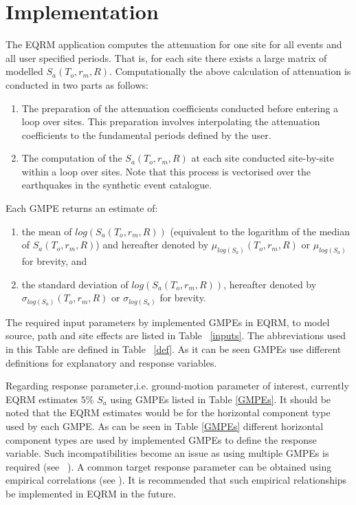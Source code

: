 \section{Implementation}\label{sec:implementation} The EQRM
application computes the attenuation for one site for all events and
all user specified periods. That is, for each site there exists a
large matrix of modelled $S_a(T_o,r_m,R)$. Computationally the above
calculation of attenuation is conducted in two parts as follows:
\begin{enumerate}
\item The preparation of the attenuation coefficients
conducted before entering a loop over sites. This preparation
involves interpolating the attenuation coefficients to the
fundamental periods defined by the user. \item The computation of
the $S_a(T_o,r_m,R)$ at each site conducted site-by-site within a
loop over sites. Note that this process is vectorised over the
earthquakes in the synthetic event catalogue.
\end{enumerate}


Each GMPE returns an estimate of:
\begin{enumerate}
\item the mean of $log(S_a(T_o,r_m,R))$ (equivalent to the
logarithm of the median of $S_a(T_o,r_m,R)$) and hereafter denoted
by $\mu_{log(S_a)}(T_o,r_m,R)$ or $\mu_{log(S_a)}$ for brevity, and
\item the standard deviation of $log(S_a(T_o,r_m,R))$, hereafter
denoted by \newline $\sigma_{log(S_a)}(T_o,r_m,R)$ or
$\sigma_{log(S_a)}$ for brevity.
\end{enumerate}


The required input parameters by implemented GMPEs in EQRM, to model
source, path and site effects are listed in Table ~\ref{inputs}. The
abbreviations used in this Table are defined in Table ~\ref{def}. As
it can be seen GMPEs use different definitions for explanatory and
response variables.

Regarding response parameter,i.e. ground-motion parameter of
interest, currently EQRM estimates $5 \%$ $S_a$ using GMPEs listed
in Table \ref{GMPEs}. It should be noted that the EQRM estimates
would be for the horizontal component type used by each GMPE. As can
be seen in Table \ref{GMPEs} different horizontal component types
are used by implemented GMPEs to define the response variable. Such
incompatibilities become an issue as using multiple GMPEs is
required (see ~). A common target
response parameter can be obtained using empirical correlations (see
\citep{eqrm_Beyer06}). It is recommended that such empirical
relationships be implemented in EQRM in the future.

